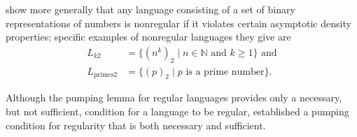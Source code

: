 \begin{enumerate}
\citet{Minsky1966UnrecognizableSets} show more generally that any language consisting of a set of binary representations of numbers is nonregular if it violates certain asymptotic density properties; specific examples of nonregular languages they give are
\begin{align*}
L_{k2} &= \{(n^{k})_{2} \mid n \in \mathbb{N} \text{ and } k \geq 1\} \text{ and} \\
L_{\text{primes}2} &= \{(p)_{2} \mid p \text{ is a prime number}\}.
\end{align*}

Although the pumping lemma for regular languages provides only a necessary, but not sufficient, condition for a language to be regular, \citet{Jaffe1978NecessarySufficientPumpingLemma} established a pumping condition for regularity that is both necessary and sufficient.
\end{enumerate}